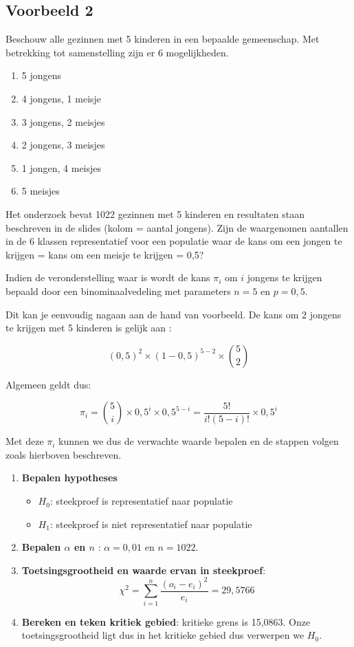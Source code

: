 \subsection{Voorbeeld 2}

Beschouw alle gezinnen met 5 kinderen in een bepaalde gemeenschap. Met betrekking tot samenstelling zijn er 6 mogelijkheden. 
\begin{enumerate}
	\item 5 jongens
	\item 4 jongens, 1 meisje
	\item 3 jongens, 2 meisjes
	\item 2 jongens, 3 meisjes
	\item 1 jongen, 4 meisjes
	\item 5 meisjes
\end{enumerate}

Het onderzoek bevat 1022 gezinnen met 5 kinderen en resultaten staan beschreven in de slides (kolom = aantal jongens). Zijn de waargenomen aantallen in de 6 klassen representatief voor een populatie waar de kans om een jongen te krijgen = kans om een meisje te krijgen = 0,5?

Indien de veronderstelling waar is wordt de kans $\pi_{i}$ om $i$ jongens te krijgen bepaald door een binominaalvedeling met parameters $n=5$ en $p=0,5$.

Dit kan je eenvoudig nagaan aan de hand van voorbeeld. De kans om 2 jongens te krijgen met 5 kinderen is gelijk aan :

\[ (0,5)^{2} \times (1-0,5)^{5-2} \times \binom{5}{2} \]
 
Algemeen geldt dus:

\[ \pi_{i} = \binom{5}{i}\times 0,5^{i} \times 0,5^{5-i} = \frac{5!}{i!(5-i)!}\times 0,5^{i} \]

Met deze $\pi_{i}$ kunnen we dus de verwachte waarde bepalen en de stappen volgen zoals hierboven beschreven. 

\begin{enumerate}
	\item \textbf{Bepalen hypotheses}
		
		\begin{itemize}
			\item $H_{0}$: steekproef is representatief naar populatie
			\item $H_{1}$: steekproef is niet representatief naar populatie
		\end{itemize}
	\item \textbf{Bepalen $\alpha$ en $n$} : $\alpha = 0,01$ en $n = 1022$.
	\item \textbf{Toetsingsgrootheid en waarde ervan in steekproef}:
	\[ \chi^{2} = \sum_{i=1}^{n} \frac{(o_{i} - e_{i})^{2}}{e_{i}} = 29,5766 \]
	\item \textbf{Bereken en teken kritiek gebied}:  kritieke grens is 15,0863. Onze toetsingsgrootheid ligt dus in het kritieke gebied dus verwerpen we $H_{0}$. 
\end{enumerate}

